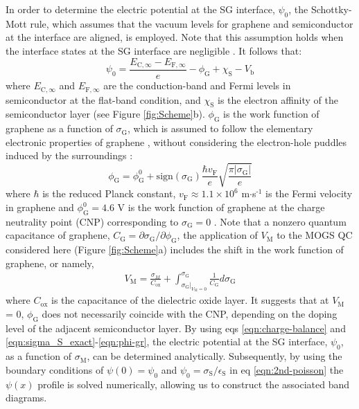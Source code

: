 \documentclass[journal=nalefd]{achemso}
\newcommand*\subs[1]{_{\text{#1}}} %
\newcommand*\sups[1]{^{\text{#1}}} %
\begin{document}
In order to determine the electric potential at the SG interface, $\psi_0$, the Schottky-Mott rule, which assumes that the vacuum levels for graphene and semiconductor at the interface are aligned, is employed.
Note that this assumption holds when the interface states at the SG interface are negligible  \cite{Xu2011Inducing, Hill1998Molecular}.
It follows that:
\begin{equation}
  \label{eqn:Shottky-Mott}
    \psi_0 = \frac{E_{\mathrm C,\infty} - E_{\mathrm F,\infty}}{e} - \phi\subs{G} + \chi\subs{S} - V\subs{b}
\end{equation}
where $E_{\mathrm C,\infty}$ and $E_{\mathrm F,\infty}$ are the conduction-band and Fermi levels in semiconductor at the flat-band condition, and $\chi\subs{S}$ is the electron affinity of the semiconductor layer (see Figure \ref{fig:Scheme}b).
$\phi\subs{G}$  is the work function of graphene as a function of $\sigma\subs{G}$, which is assumed to follow the elementary electronic properties of graphene \cite{Xu2011Measurements}, without considering the electron-hole puddles induced by the surroundings \cite{Sarma2011Electronic}:
\begin{equation}
  \label{eqn:phi-gr}
  \phi\subs{G} = \phi\subs{G}^{0} + \mathrm{sign}(\sigma\subs{G})\frac{\hbar v\subs{F}}{e}\sqrt{\frac{\pi |\sigma\subs{G}|}{e}}
\end{equation}
where $\hbar$ is the reduced Planck constant, $v\subs{F} \approx 1.1\times10^6 $ m$\cdot$s$\sups{-1}$ is the Fermi velocity in graphene and $\phi^0\subs{G} = 4.6$ V is the work function of graphene at the charge neutrality point (CNP) corresponding to $\sigma\subs{G} = 0$ \cite{Yu2009Tuning}. 
Note that a nonzero quantum capacitance of graphene, $C\subs{G}=\partial \sigma\subs{G}/\partial \phi\subs{G}$, the application of $V\subs{M}$ to the MOGS QC considered here (Figure \ref{fig:Scheme}a) includes the shift in the work function of graphene, or namely, 
\begin{align}
    \label{eqn:V_M}
    V\subs{M} = \frac{\sigma_{M}}{C\subs{ox}} + \int_{\sigma\subs{G}|_{V\subs{M}=0}}^{\sigma\subs{G}} \frac{1}{C\subs{G}} d\sigma\subs{G}
\end{align}
where $C\subs{ox}$ is the capacitance of the dielectric oxide layer.
It suggests that at $V\subs{M}$ = 0, $\phi\subs{G}$ does not necessarily coincide with the CNP, depending on the doping level of the adjacent semiconductor layer.
By using eqs \ref{eqn:charge-balance} and \ref{eqn:sigma_S_exact}-\ref{eqn:phi-gr}, the electric potential at the SG interface, $\psi_0$, as a function of $\sigma\subs{M}$, can be determined analytically.
Subsequently, by using the boundary conditions of $\psi(0)=\psi_0$ and $\psi_0 = \sigma\subs{S}/\epsilon\subs{S}$ in eq \ref{eqn:2nd-poisson} the $\psi(x)$ profile is solved numerically, allowing us to construct the associated band diagrams.
\end{document}
